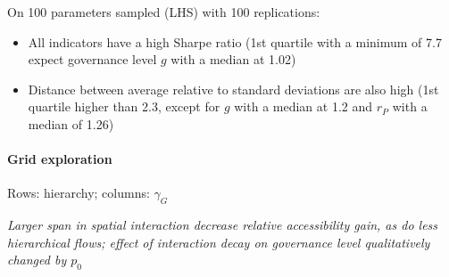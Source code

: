 \documentclass[12pt]{iopart}
\begin{document}
{On 100 parameters sampled (LHS) with 100 replications:

\begin{itemize}
	\item All indicators have a high Sharpe ratio (1st quartile with a minimum of 7.7 expect governance level $g$ with a median at 1.02)
	\item Distance between average relative to standard deviations are also high (1st quartile higher than 2.3, except for $g$ with a median at 1.2 and $r_P$ with a median of 1.26)
\end{itemize}








\paragraph{Grid exploration}







{\footnotesize Rows: hierarchy; columns: $\gamma_G$}

\textit{Larger span in spatial interaction decrease relative accessibility gain, as do less hierarchical flows; effect of interaction decay on governance level qualitatively changed by $p_0$}




}
\end{document}
